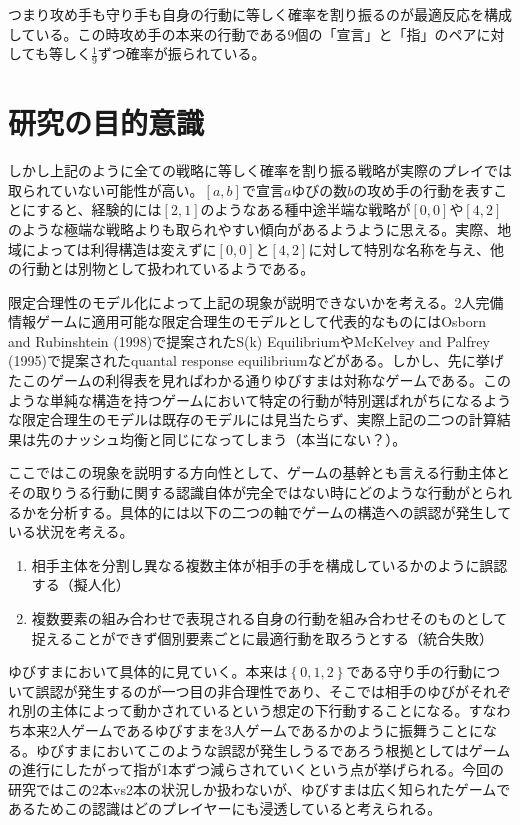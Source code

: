\documentclass{jsarticle}
\begin{document}
つまり攻め手も守り手も自身の行動に等しく確率を割り振るのが最適反応を構成している。この時攻め手の本来の行動である$9$個の「宣言」と「指」のペアに対しても等しく$\frac{1}{9}$ずつ確率が振られている。

\section{研究の目的意識}
しかし上記のように全ての戦略に等しく確率を割り振る戦略が実際のプレイでは取られていない可能性が高い。$[a,b]$で宣言$a$ゆびの数$b$の攻め手の行動を表すことにすると、経験的には$[2,1]$のようなある種中途半端な戦略が$[0,0]$や$[4,2]$のような極端な戦略よりも取られやすい傾向があるようように思える。実際、地域によっては利得構造は変えずに$[0,0]$と$[4,2]$に対して特別な名称を与え、他の行動とは別物として扱われているようである。

限定合理性のモデル化によって上記の現象が説明できないかを考える。2人完備情報ゲームに適用可能な限定合理生のモデルとして代表的なものにはOsborn and Rubinshtein (1998)で提案されたS(k) EquilibriumやMcKelvey and Palfrey (1995)で提案されたquantal response equilibriumなどがある。しかし、先に挙げたこのゲームの利得表を見ればわかる通りゆびすまは対称なゲームである。このような単純な構造を持つゲームにおいて特定の行動が特別選ばれがちになるような限定合理生のモデルは既存のモデルには見当たらず、実際上記の二つの計算結果は先のナッシュ均衡と同じになってしまう（本当にない？）。

ここではこの現象を説明する方向性として、ゲームの基幹とも言える行動主体とその取りうる行動に関する認識自体が完全ではない時にどのような行動がとられるかを分析する。具体的には以下の二つの軸でゲームの構造への誤認が発生している状況を考える。
\begin{enumerate}
	\item 相手主体を分割し異なる複数主体が相手の手を構成しているかのように誤認する（擬人化）
	\item 複数要素の組み合わせで表現される自身の行動を組み合わせそのものとして捉えることができず個別要素ごとに最適行動を取ろうとする（統合失敗）
\end{enumerate}

ゆびすまにおいて具体的に見ていく。本来は$\left\{ 0,1,2 \right\}$である守り手の行動について誤認が発生するのが一つ目の非合理性であり、そこでは相手のゆびがそれぞれ別の主体によって動かされているという想定の下行動することになる。すなわち本来2人ゲームであるゆびすまを3人ゲームであるかのように振舞うことになる。ゆびすまにおいてこのような誤認が発生しうるであろう根拠としてはゲームの進行にしたがって指が1本ずつ減らされていくという点が挙げられる。今回の研究ではこの2本vs2本の状況しか扱わないが、ゆびすまは広く知られたゲームであるためこの認識はどのプレイヤーにも浸透していると考えられる。
\end{document}
